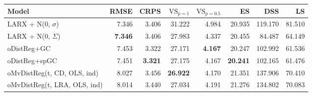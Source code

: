 \begin{tabular}{lrrrrrrr}
\toprule
Model & RMSE & CRPS & $\text{VS}_{p=1}$ & $\text{VS}_{p=0.5}$ & ES & DSS & LS \\
\midrule
LARX + N(0, $\sigma$) & {\cellcolor[HTML]{30123B}} \color[HTML]{F1F1F1} 7.346 & {\cellcolor[HTML]{4773EB}} \color[HTML]{F1F1F1} 3.406 & {\cellcolor[HTML]{AC1701}} \color[HTML]{F1F1F1} 31.222 & {\cellcolor[HTML]{7A0403}} \color[HTML]{F1F1F1} 4.984 & {\cellcolor[HTML]{448FFE}} \color[HTML]{F1F1F1} 20.935 & {\cellcolor[HTML]{FABA39}} \color[HTML]{000000} 119.170 & {\cellcolor[HTML]{7A0403}} \color[HTML]{F1F1F1} 81.510 \\
LARX + N(0, $\Sigma$) & {\cellcolor[HTML]{30123B}} \color[HTML]{F1F1F1} \bfseries 7.346 & {\cellcolor[HTML]{4773EB}} \color[HTML]{F1F1F1} 3.406 & {\cellcolor[HTML]{31AFF5}} \color[HTML]{F1F1F1} 27.983 & {\cellcolor[HTML]{3BA0FD}} \color[HTML]{F1F1F1} 4.337 & {\cellcolor[HTML]{3F3B97}} \color[HTML]{F1F1F1} 20.455 & {\cellcolor[HTML]{3E3891}} \color[HTML]{F1F1F1} 84.487 & {\cellcolor[HTML]{1CE6B4}} \color[HTML]{000000} 64.149 \\
oDistReg+GC & {\cellcolor[HTML]{4146AC}} \color[HTML]{F1F1F1} 7.453 & {\cellcolor[HTML]{30123B}} \color[HTML]{F1F1F1} 3.322 & {\cellcolor[HTML]{3E3891}} \color[HTML]{F1F1F1} 27.171 & {\cellcolor[HTML]{30123B}} \color[HTML]{F1F1F1} \bfseries 4.167 & {\cellcolor[HTML]{30123B}} \color[HTML]{F1F1F1} 20.247 & {\cellcolor[HTML]{35F394}} \color[HTML]{000000} 102.992 & {\cellcolor[HTML]{2FB2F4}} \color[HTML]{F1F1F1} 61.536 \\
oDistReg+spGC & {\cellcolor[HTML]{4143A7}} \color[HTML]{F1F1F1} 7.451 & {\cellcolor[HTML]{30123B}} \color[HTML]{F1F1F1} \bfseries 3.321 & {\cellcolor[HTML]{3F3B97}} \color[HTML]{F1F1F1} 27.175 & {\cellcolor[HTML]{30123B}} \color[HTML]{F1F1F1} 4.167 & {\cellcolor[HTML]{30123B}} \color[HTML]{F1F1F1} \bfseries 20.241 & {\cellcolor[HTML]{2AEFA1}} \color[HTML]{000000} 102.165 & {\cellcolor[HTML]{31AFF5}} \color[HTML]{F1F1F1} 61.476 \\
oMvDistReg(t, CD, OLS, ind) & {\cellcolor[HTML]{79FE59}} \color[HTML]{000000} 8.027 & {\cellcolor[HTML]{37A8FA}} \color[HTML]{F1F1F1} 3.456 & {\cellcolor[HTML]{30123B}} \color[HTML]{F1F1F1} \bfseries 26.922 & {\cellcolor[HTML]{30123B}} \color[HTML]{F1F1F1} 4.170 & {\cellcolor[HTML]{1AD2D2}} \color[HTML]{000000} 21.351 & {\cellcolor[HTML]{7A0403}} \color[HTML]{F1F1F1} 137.906 & {\cellcolor[HTML]{D4E735}} \color[HTML]{000000} 70.410 \\
oMvDistReg(t, LRA, OLS, ind) & {\cellcolor[HTML]{71FE5F}} \color[HTML]{000000} 8.014 & {\cellcolor[HTML]{4196FF}} \color[HTML]{F1F1F1} 3.440 & {\cellcolor[HTML]{372466}} \color[HTML]{F1F1F1} 27.034 & {\cellcolor[HTML]{38276D}} \color[HTML]{F1F1F1} 4.191 & {\cellcolor[HTML]{20C7DF}} \color[HTML]{000000} 21.276 & {\cellcolor[HTML]{A71401}} \color[HTML]{F1F1F1} 134.802 & {\cellcolor[HTML]{CDEC34}} \color[HTML]{000000} 70.083 \\

\end{tabular}

